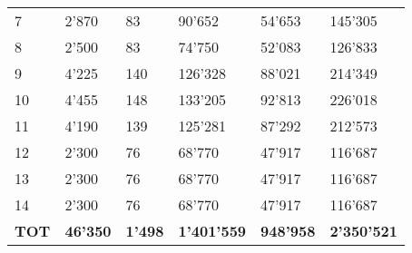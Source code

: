 \begin{table}[h!]
\begin{tabular}{llllll}
7        & 2'870                                                                  & 83          & 90'652                                                          & 54'653          & 145'305   \\
8        & 2'500                                                                  & 83          & 74'750                                                          & 52'083          & 126'833   \\
9        & 4'225                                                                  & 140         & 126'328                                                         & 88'021          & 214'349   \\
10       & 4'455                                                                  & 148         & 133'205                                                         & 92'813          & 226'018   \\
11       & 4'190                                                                  & 139         & 125'281                                                         & 87'292          & 212'573   \\
12       & 2'300                                                                  & 76          & 68'770                                                          & 47'917          & 116'687   \\
13       & 2'300                                                                  & 76          & 68'770                                                          & 47'917          & 116'687   \\
14       & 2'300                                                                  & 76          & 68'770                                                          & 47'917          & 116'687   \\
\midrule
\textbf{TOT}      & \textbf{46'350}                              & \textbf{1'498}       & \textbf{1'401'559}      & \textbf{948'958}         & \textbf{2'350'521} \\
\bottomrule
\end{tabular}
\end{table}